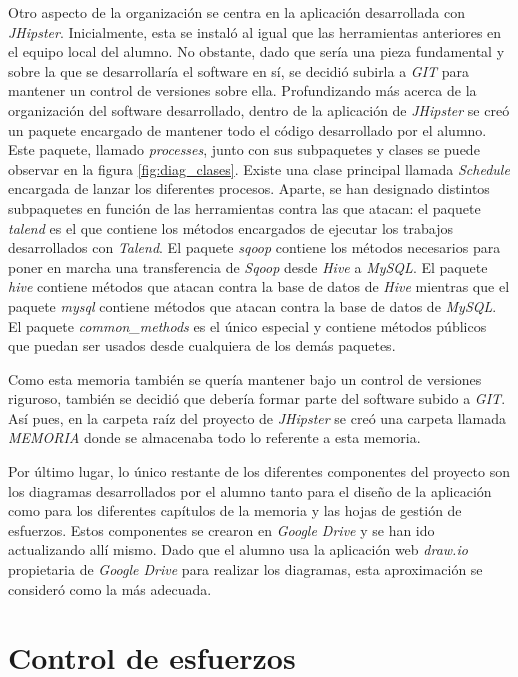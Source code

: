 \par Otro aspecto de la organización se centra en la aplicación desarrollada con \textit{JHipster}. Inicialmente, esta se instaló al igual que las herramientas anteriores en el equipo local del alumno. No obstante, dado que sería una pieza fundamental y sobre la que se desarrollaría el software en sí, se decidió subirla a \textit{GIT} para mantener un control de versiones sobre ella. Profundizando más acerca de la organización del software desarrollado, dentro de la aplicación de \textit{JHipster} se creó un paquete encargado de mantener todo el código desarrollado por el alumno. Este paquete, llamado \textit{processes}, junto con sus subpaquetes y clases se puede observar en la figura \ref{fig:diag_clases}. Existe una clase principal llamada \textit{Schedule} encargada de lanzar los diferentes procesos. Aparte, se han designado distintos subpaquetes en función de las herramientas contra las que atacan: el paquete \textit{talend} es el que contiene los métodos encargados de ejecutar los trabajos desarrollados con \textit{Talend}. El paquete \textit{sqoop} contiene los métodos necesarios para poner en marcha una transferencia de \textit{Sqoop} desde \textit{Hive} a \textit{MySQL}. El paquete \textit{hive} contiene métodos que atacan contra la base de datos de \textit{Hive} mientras que el paquete \textit{mysql} contiene métodos que atacan contra la base de datos de \textit{MySQL}. El paquete \textit{common\_methods} es el único especial y contiene métodos públicos que puedan ser usados desde cualquiera de los demás paquetes. 
\par Como esta memoria también se quería mantener bajo un control de versiones riguroso, también se decidió que debería formar parte del software subido a \textit{GIT}. Así pues, en la carpeta raíz del proyecto de \textit{JHipster} se creó una carpeta llamada \textit{MEMORIA} donde se almacenaba todo lo referente a esta memoria.
\par Por último lugar, lo único restante de los diferentes componentes del proyecto son los diagramas desarrollados por el alumno tanto para el diseño de la aplicación como para los diferentes capítulos de la memoria y las hojas de gestión de esfuerzos. Estos componentes se crearon en \textit{Google Drive} y se han ido actualizando allí mismo. Dado que el alumno usa la aplicación web \textit{draw.io} propietaria de \textit{Google Drive} para realizar los diagramas, esta aproximación se consideró como la más adecuada. 

\section{Control de esfuerzos} \label{gestion.esfuerzos}

